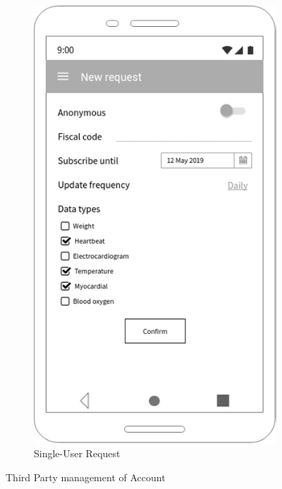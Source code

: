 \begin{figure}[h!]
\begin{subfigure}[b]{0.4\linewidth}
    \includegraphics[width=\linewidth]{img/mockup/tp_sreq.jpg}
    \caption{Single-User Request}
  \end{subfigure}
\caption{Third Party management of Account }
 \end{figure}

